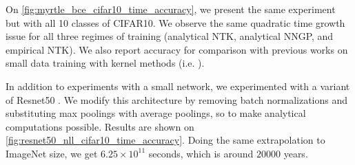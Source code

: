 \documentclass{article}
\begin{document}
    On \cref{fig:myrtle_bce_cifar10_time_accuracy}, we present the same experiment but with all 10 classes of CIFAR10.
    We observe the same quadratic time growth issue for all three regimes of training (analytical NTK, analytical NNGP, and empirical NTK).
    We also report accuracy for comparison with previous works on small data training with kernel methods (i.e. \cite{arora2019harnessing}).

    In addition to experiments with a small network, we experimented with a variant of Resnet50 \cite{he2016deep}.
    We modify this architecture by removing batch normalizations and substituting max poolings with average poolings, so to make analytical computations possible.
    Results are shown on \cref{fig:resnet50_nll_cifar10_time_accuracy}.
    Doing the same extrapolation to ImageNet size, we get $6.25 \times 10^{11}$ seconds, which is around $20000$ years.

\end{document}
